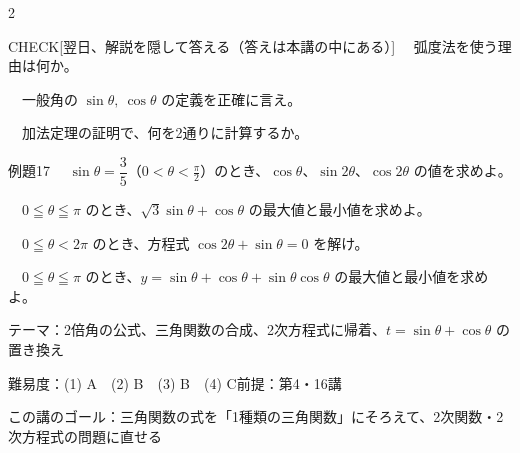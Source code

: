 \documentclass[paper=b5j, fontsize=8pt, fleqn, twoside]{jlreq}
\begin{document}
\begin{multicols*}{2}
  \begin{ptbs}{CHECK}[翌日、解説を隠して答える（答えは本講の中にある）]
    　弧度法を使う理由は何か。\par
    　一般角の $\sin\theta,\ \cos\theta$ の定義を正確に言え。\par
    　加法定理の証明で、何を2通りに計算するか。
  \end{ptbs}

  \notefill
\end{multicols*}

\begin{ascolorbox4A}[出典：オリジナル]{例題17}
  　$\sin\theta=\dfrac35$（$0<\theta<\frac\pi2$）のとき、$\cos\theta$、$\sin2\theta$、$\cos2\theta$ の値を求めよ。\par
  　$0\leqq\theta\leqq\pi$ のとき、$\sqrt3\sin\theta+\cos\theta$ の最大値と最小値を求めよ。\par
  　$0\leqq\theta<2\pi$ のとき、方程式 $\cos2\theta+\sin\theta=0$ を解け。\par
  　$0\leqq\theta\leqq\pi$ のとき、$y=\sin\theta+\cos\theta+\sin\theta\cos\theta$ の最大値と最小値を求めよ。
\end{ascolorbox4A}

\begin{Data}
  テーマ：2倍角の公式、三角関数の合成、2次方程式に帰着、$t=\sin\theta+\cos\theta$ の置き換え\par
  難易度：(1) A　(2) B　(3) B　(4) C\quad 前提：第4・16講\par
  この講のゴール：三角関数の式を「1種類の三角関数」にそろえて、2次関数・2次方程式の問題に直せる
\end{Data}
\end{document}
